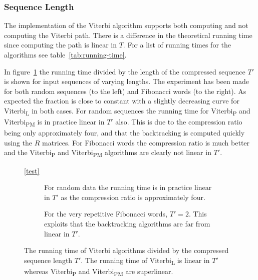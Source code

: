 \subsubsection{Sequence Length}

The implementation of the Viterbi algorithm supports both computing and not
computing the Viterbi path. There is a difference in the theoretical running
time since computing the path is linear in $T$. For a list of running times
for the algorithms see table~\ref{tab:running-time}.

In figure~\ref{fig:assymptotic_viterbi_T} the running time divided by the
length of the compressed sequence $T'$ is shown for input sequences of varying
lengths. The experiment has been made for both random sequences (to the left)
and Fibonacci words (to the right). As expected the fraction is close to
constant with a slightly decreasing curve for Viterbi\textsubscript{L} in both
cases. For random sequences the running time for Viterbi\textsubscript{P} and
Viterbi\textsubscript{PM} is in practice linear in $T'$ also. This is due to
the compression ratio being only approximately four, and that the backtracking
is computed quickly using the $R$ matrices. For Fibonacci words the compression
ratio is much better and the Viterbi\textsubscript{P} and
Viterbi\textsubscript{PM} algorithms are clearly not linear in $T'$.

\begin{figure}
  \centering\ref{test}
  \begin{subfigure}[b]{0.5\textwidth}
    \centering 
    \captionsetup{margin=10pt}
    \caption{For random data the running time is in practice linear in $T'$ as
      the compression ratio is approximately four.}
  \end{subfigure}%
  \begin{subfigure}[b]{0.5\textwidth}
    \centering 
    \captionsetup{margin=10pt}
    \caption{For the very repetitive Fibonacci words, $T' = 2$. This exploits
      that the backtracking algorithms are far from linear in $T'$.}
  \end{subfigure}
  \caption{The running time of Viterbi algorithms divided by the compressed
    sequence length $T'$. The running time of Viterbi\textsubscript{L} is
    linear in $T'$ whereas Viterbi\textsubscript{P} and
    Viterbi\textsubscript{PM} are superlinear.}
  \label{fig:assymptotic_viterbi_T}
\end{figure}

